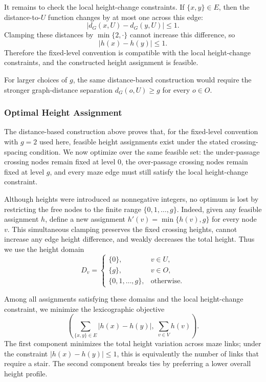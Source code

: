 \documentclass[acmsmall,screen,nonacm]{acmart}
\begin{document}
It remains to check the local height-change constraints. If
\(\{x,y\}\in E\), then the distance-to-\(U\) function changes by at
most one across this edge:
\[
|d_G(x,U)-d_G(y,U)|\le 1.
\]
Clamping these distances by \(\min\{2,\cdot\}\) cannot increase this
difference, so
\[
|h(x)-h(y)|\le 1.
\]
Therefore the fixed-level convention is compatible with the local
height-change constraints, and the constructed height assignment is
feasible.

For larger choices of \(g\), the same distance-based construction
would require the stronger graph-distance separation
\(d_G(o,U)\ge g\) for every \(o\in O\).

\subsubsection{Optimal Height Assignment}

The distance-based construction above proves that, for the fixed-level
convention with \(g=2\) used here, feasible height assignments exist
under the stated crossing-spacing condition. We now optimize over the
same feasible set: the under-passage crossing nodes remain fixed at
level \(0\), the over-passage crossing nodes remain fixed at level
\(g\), and every maze edge must still satisfy the local height-change
constraint.

Although heights were introduced as nonnegative integers, no optimum
is lost by restricting the free nodes to the finite range
\(\{0,1,\ldots,g\}\). Indeed, given any feasible assignment \(h\),
define a new assignment \(h'(v)=\min\{h(v),g\}\) for every node
\(v\). This simultaneous clamping preserves the fixed crossing
heights, cannot increase any edge height difference, and weakly
decreases the total height. Thus we use the height domain
\[
D_v =
\begin{cases}
\{0\}, & v\in U,\\
\{g\}, & v\in O,\\
\{0,1,\ldots,g\}, & \text{otherwise}.
\end{cases}
\]

Among all assignments satisfying these domains and the local
height-change constraint, we minimize the lexicographic objective
\[
\left(
\sum_{\{x,y\}\in E}|h(x)-h(y)|,\;
\sum_{v\in V}h(v)
\right).
\]
The first component minimizes the total height variation across maze
links; under the constraint \(|h(x)-h(y)|\le 1\), this is equivalently
the number of links that require a stair. The second component breaks
ties by preferring a lower overall height profile.
\end{document}
